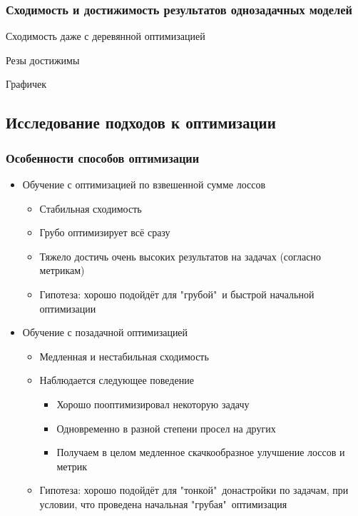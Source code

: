 \documentclass[aspectratio=169]{beamer}
\begin{document}
\begin{frame}
	\frametitle{Сходимость и достижимость результатов однозадачных моделей}
	Сходимость даже с деревянной оптимизацией

	Резы достижимы

	Графичек
\end{frame}


\subsection{Исследование подходов к оптимизации}

\begin{frame}
	\frametitle{Особенности способов оптимизации}
	\begin{itemize}
		\item Обучение с оптимизацией по взвешенной сумме лоссов
		\begin{itemize}
			\item Стабильная сходимость
			\item Грубо оптимизирует всё сразу
			\item Тяжело достичь очень высоких результатов на задачах (согласно метрикам)
			\item Гипотеза: хорошо подойдёт для "грубой"\ и быстрой начальной оптимизации 
		\end{itemize}
		\item Обучение с позадачной оптимизацией
		\begin{itemize}
			\item Медленная и нестабильная сходимость
			\item Наблюдается следующее поведение
			\begin{itemize}
				\item Хорошо пооптимизировал некоторую задачу
				\item Одновременно в разной степени просел на других 
				\item Получаем в целом медленное скачкообразное улучшение лоссов и метрик
			\end{itemize}
			\item Гипотеза: хорошо подойдёт для "тонкой"\ донастройки по задачам, при условии, что проведена начальная "грубая"\ оптимизация
		\end{itemize}
	\end{itemize}
\end{frame}
\end{document}

